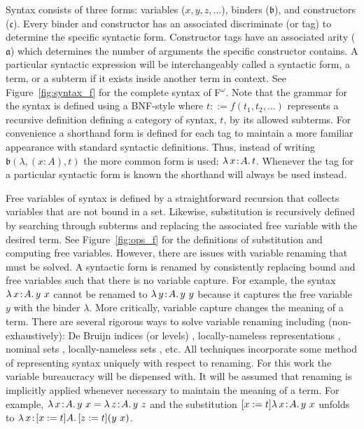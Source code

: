 

Syntax consists of three forms: variables ($x, y, z, \ldots$), binders ($\mathfrak{b}$), and constructors ($\mathfrak{c}$).
Every binder and constructor has an associated discriminate (or tag) to determine the specific syntactic form.
Constructor tags have an associated arity ($\mathfrak{a}$) which determines the number of arguments the specific constructor contains.
A particular syntactic expression will be interchangeably called a syntactic form, a term, or a subterm if it exists inside another term in context.
See Figure~\ref{fig:syntax_f} for the complete syntax of F$^\omega$.
Note that the grammar for the syntax is defined using a BNF-style \cite{floyd1961_bnf} where $t ::= f(t_1, t_2, \ldots)$ represents a recursive definition defining a category of syntax, $t$, by its allowed subterms.
For convenience a shorthand form is defined for each tag to maintain a more familiar appearance with standard syntactic definitions.
Thus, instead of writing $\mathfrak{b}(\lambda, (x : A), t)$ the more common form is used: ${\lambda}\, x\! : \! A.\, t$.
Whenever the tag for a particular syntactic form is known the shorthand will always be used instead.



Free variables of syntax is defined by a straightforward recursion that collects variables that are not bound in a set.
Likewise, substitution is recursively defined by searching through subterms and replacing the associated free variable with the desired term.
See Figure~\ref{fig:ops_f} for the definitions of substitution and computing free variables.
However, there are issues with variable renaming that must be solved.
A syntactic form is renamed by consistently replacing bound and free variables such that there is no variable capture.
For example, the syntax ${\lambda}\, x\! : \! A.\, y\ x$ cannot be renamed to ${\lambda}\, y\! : \! A.\, y\ y$ because it captures the free variable $y$ with the binder $\lambda$.
More critically, variable capture changes the meaning of a term.
There are several rigorous ways to solve variable renaming including (non-exhaustively): De Bruijn indices (or levels) \cite{debruijn1972}, locally-nameless representations \cite{chargueraud2012}, nominal sets \cite{pitts2013_nominal}, locally-nameless sets \cite{pitts2023_lns}, etc.
All techniques incorporate some method of representing syntax uniquely with respect to renaming.
For this work the variable bureaucracy will be dispensed with.
It will be assumed that renaming is implicitly applied whenever necessary to maintain the meaning of a term.
For example, $\abs{\lambda}{x}{A}{y\ x} = \abs{\lambda}{z}{A}{y\ z}$ and the substitution $[x := t]{\lambda}\, x\! : \! A.\, y\ x$ unfolds to $\abs{\lambda}{x}{[x := t]A}{[z := t](y\ x)}$.

